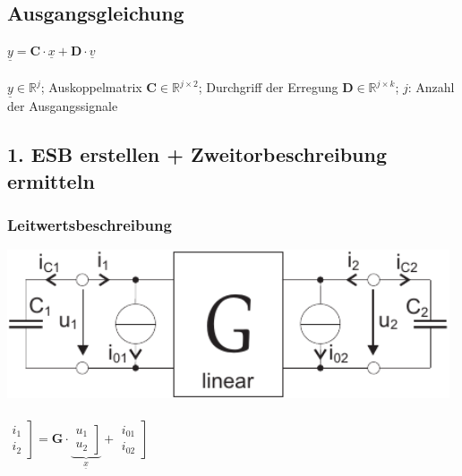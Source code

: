 \documentclass[a4paper,twocolumn,10pt]{article}
\begin{document}
\subsection*{Ausgangsgleichung}
$\underline{y}=\textbf{C}\cdot \underline{x}+\textbf{D}\cdot \underline{v}$\\\\
$\underline{y}\in \mathbb{R}^{j}$; Auskoppelmatrix $\textbf{C}\in \mathbb{R}^{j\times 2}$; Durchgriff der Erregung $\textbf{D}\in \mathbb{R}^{j\times k}$; $j$: Anzahl der Ausgangssignale
\subsection*{1. ESB erstellen + Zweitorbeschreibung ermitteln}
\begin{minipage}[t]{0.23\textwidth}
\subsubsection*{Leitwertsbeschreibung}
\includegraphics[width=0.98\textwidth]{img/ESBzweitenGrades1}\\\\
$\left.\begin{matrix}i_1 \\ i_2\end{matrix}\right]=\textbf{G}\cdot \underbrace{\left.\begin{matrix}u_1 \\ u_2\end{matrix}\right]}_{\underline{x}}+\left.\begin{matrix}i_{01} \\ i_{02}\end{matrix}\right]$
\end{minipage}
\hfill
\end{document}
